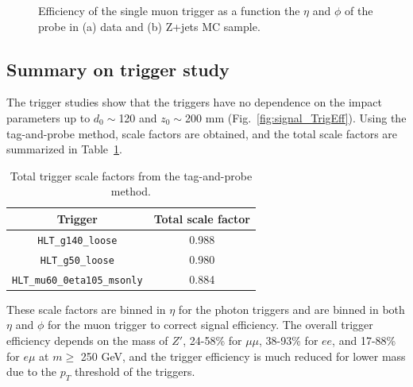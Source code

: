 \begin{figure}[!htb]
    \centering
    \caption{Efficiency of the single muon trigger as a function the $\eta$ and $\phi$ of the probe in (a) data and (b) Z+jets MC sample.}
    \label{fig:MuonTrigEff2D}
\end{figure}

\subsection{Summary on trigger study}
The trigger studies show that the triggers have no dependence on the impact parameters up to $d_{0}\sim$120 and $z_{0}\sim$200 mm (Fig.~\ref{fig:signal_TrigEff}). Using the tag-and-probe method, scale factors are obtained, and the total scale factors are summarized in Table~\ref{table:trigger_scale_factor}.

\begin{table}[!htb]
	\centering
	\begin{tabular}{cc}
		\hline
		\hline
		Trigger                                     & Total scale factor \\
		\hline
        \texttt{HLT\_g140\_loose}                   & 0.988 \\
        \texttt{HLT\_g50\_loose}                    & 0.980 \\
        \texttt{HLT\_mu60\_0eta105\_msonly}         & 0.884 \\
		\hline
		\hline
	\end{tabular}
	\caption{Total trigger scale factors from the tag-and-probe method.}
	\label{table:trigger_scale_factor}
\end{table}
These scale factors are binned in $\eta$ for the photon triggers and are binned in both $\eta$ and $\phi$ for the muon trigger to correct signal efficiency. The overall trigger efficiency depends on the mass of $Z'$, 24-58\% for $\mu\mu$, 38-93\% for $ee$, and 17-88\% for $e\mu$ at $m\geq$ 250 GeV, and the trigger efficiency is much reduced for lower mass due to the $p_{T}$ threshold of the triggers.


